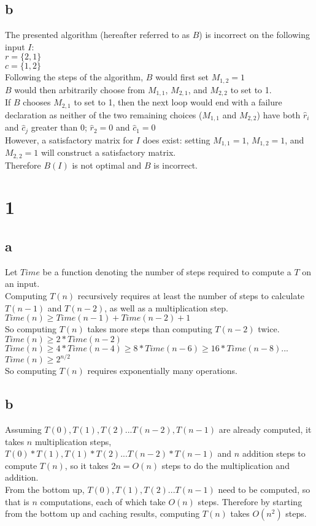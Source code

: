 \documentclass[letterpaper,notitlepage,twoside]{article}
\begin{document}
\subsection*{b}
The presented algorithm (hereafter referred to as $B$) is incorrect on the following input $I$: \\
 $r = \{2, 1\}$\\
 $c = \{1, 2\}$ \\
 Following the steps of the algorithm, $B$ would first set $M_{1,2} = 1$ \\
 $B$ would then arbitrarily choose from $M_{1,1}$, $M_{2,1}$, and $M_{2,2}$ to set to 1. \\
 If $B$ chooses $M_{2,1}$ to set to 1, then the next loop would end with a failure declaration as neither of the two remaining choices ($M_{1,1}$ and $M_{2,2}$) have both $\hat r_i$ and $\hat c_j$ greater than 0; $\hat r_2 = 0$ and $\hat c_1 = 0$  \\
 However, a satisfactory matrix for $I$ does exist: setting $M_{1,1} = 1$, $M_{1,2} = 1$, and $M_{2,2} = 1$ will construct a satisfactory matrix. \\
 Therefore $B(I)$ is not optimal and $B$ is incorrect.


\section*{1}
\subsection*{a}
Let $Time$ be a function denoting the number of steps required to compute a $T$ on an input. \\
Computing $T(n)$ recursively requires at least the number of steps to calculate $T(n - 1)$ and $T(n - 2)$, as well as a multiplication step. \\
$Time(n) \geq Time(n - 1) + Time(n - 2) + 1$ \\
So computing $T(n)$ takes more steps than computing $T(n - 2)$ twice. \\
$Time(n) \geq 2 * Time(n - 2)$ \\
$Time(n) \geq 4 * Time(n - 4) \geq 8 * Time(n - 6) \geq 16 * Time(n - 8) ...$ \\
$Time(n) \geq 2^{n/2}$ \\
So computing $T(n)$ requires exponentially many operations.

\subsection*{b}
Assuming $T(0), T(1), T(2)...T(n -2), T(n - 1)$ are already computed, it takes $n$ multiplication steps, $T(0) * T(1), T(1) * T(2)...T(n - 2) * T(n - 1)$ and $n$ addition steps to compute $T(n)$, so it takes $2n = O(n)$ steps to do the multiplication and addition. \\
From the bottom up, $T(0), T(1), T(2)...T(n - 1)$ need to be computed, so that is $n$ computations, each of which take $O(n)$ steps. Therefore by starting from the bottom up and caching results, computing $T(n)$ takes $O(n^2)$ steps.
\end{document}
